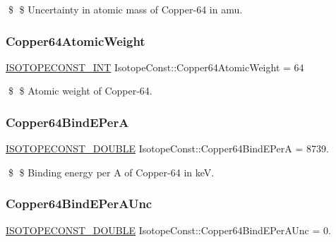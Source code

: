 \$ \$ Uncertainty in atomic mass of Copper-\/64 in amu. \mbox{\label{group___isotope_const-_copper-_cu64_gad78c803a936311b5e93128ca72bfd7ac}} 
\subsubsection{\texorpdfstring{Copper64\+Atomic\+Weight}{Copper64AtomicWeight}}
{\footnotesize\ttfamily \mbox{\hyperlink{group___isotope_const-_macros_ga5f18360b3e99483a35c32d789e62621c}{I\+S\+O\+T\+O\+P\+E\+C\+O\+N\+S\+T\+\_\+\+I\+NT}} Isotope\+Const\+::\+Copper64\+Atomic\+Weight = 64}

\$ \$ Atomic weight of Copper-\/64. \mbox{\label{group___isotope_const-_copper-_cu64_ga98129cdccc6358e7d085760c16bcac29}} 
\subsubsection{\texorpdfstring{Copper64\+Bind\+E\+PerA}{Copper64BindEPerA}}
{\footnotesize\ttfamily \mbox{\hyperlink{group___isotope_const-_macros_ga8f45a7272ce02c0b4c65c44636ed719a}{I\+S\+O\+T\+O\+P\+E\+C\+O\+N\+S\+T\+\_\+\+D\+O\+U\+B\+LE}} Isotope\+Const\+::\+Copper64\+Bind\+E\+PerA = 8739.}

\$ \$ Binding energy per A of Copper-\/64 in keV. \mbox{\label{group___isotope_const-_copper-_cu64_ga383ba55759e69920359685f66f89498a}} 
\subsubsection{\texorpdfstring{Copper64\+Bind\+E\+Per\+A\+Unc}{Copper64BindEPerAUnc}}
{\footnotesize\ttfamily \mbox{\hyperlink{group___isotope_const-_macros_ga8f45a7272ce02c0b4c65c44636ed719a}{I\+S\+O\+T\+O\+P\+E\+C\+O\+N\+S\+T\+\_\+\+D\+O\+U\+B\+LE}} Isotope\+Const\+::\+Copper64\+Bind\+E\+Per\+A\+Unc = 0.}

